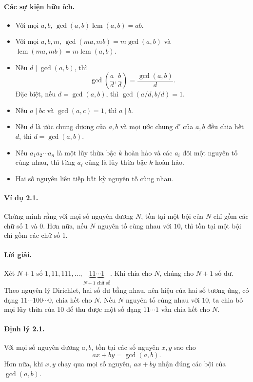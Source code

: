 \documentclass[11pt]{article}
\DeclareMathOperator{\lcm}{lcm}
\begin{document}
\paragraph{Các sự kiện hữu ích.}
\begin{itemize}
\item Với mọi \(a,b\), \(\gcd(a,b)\lcm(a,b)=ab\).
\item Với mọi \(a,b,m\), \(\gcd(ma,mb)=m\gcd(a,b)\) và
\(\lcm(ma,mb)=m\lcm(a,b)\).
\item Nếu \(d\mid\gcd(a,b)\), thì
\[
 \gcd\left(\frac ad,\frac bd\right)=\frac{\gcd(a,b)}d.
\]
Đặc biệt, nếu \(d=\gcd(a,b)\), thì \(\gcd(a/d,b/d)=1\).
\item Nếu \(a\mid bc\) và \(\gcd(a,c)=1\), thì \(a\mid b\).
\item Nếu \(d\) là ước chung dương của \(a,b\) và mọi ước chung \(d'\) của
\(a,b\) đều chia hết \(d\), thì \(d=\gcd(a,b)\).
\item Nếu \(a_1a_2\cdots a_n\) là một lũy thừa bậc \(k\) hoàn hảo và các
\(a_i\) đôi một nguyên tố cùng nhau, thì từng \(a_i\) cũng là lũy thừa bậc
\(k\) hoàn hảo.
\item Hai số nguyên liên tiếp bất kỳ nguyên tố cùng nhau.
\end{itemize}

\paragraph{Ví dụ 2.1.}
Chứng minh rằng với mọi số nguyên dương \(N\), tồn tại một bội của \(N\) chỉ
gồm các chữ số \(1\) và \(0\). Hơn nữa, nếu \(N\) nguyên tố cùng nhau với
\(10\), thì tồn tại một bội chỉ gồm các chữ số \(1\).

\paragraph{Lời giải.}
Xét \(N+1\) số \(1,11,111,\ldots,\underbrace{11\cdots1}_{N+1\text{ chữ số}}\).
Khi chia cho \(N\), chúng cho \(N+1\) số dư. Theo nguyên lý Dirichlet, hai số
dư bằng nhau, nên hiệu của hai số tương ứng, có dạng \(11\cdots100\cdots0\),
chia hết cho \(N\). Nếu \(N\) nguyên tố cùng nhau với \(10\), ta chia bỏ mọi
lũy thừa của \(10\) để thu được một số dạng \(11\cdots1\) vẫn chia hết cho
\(N\).

\paragraph{Định lý 2.1.}
Với mọi số nguyên dương \(a,b\), tồn tại các số nguyên \(x,y\) sao cho
\[
 ax+by=\gcd(a,b).
\]
Hơn nữa, khi \(x,y\) chạy qua mọi số nguyên, \(ax+by\) nhận đúng các bội của
\(\gcd(a,b)\).
\end{document}
